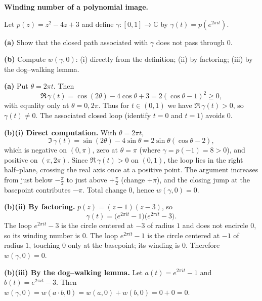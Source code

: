\begin{problem}[CP-II-0536]
\label{prob:cp-ii-0536}
\textbf{Winding number of a polynomial image.}

\hspace*{1.5em}Let $p(z)=z^{2}-4z+3$ and define $\gamma:[0,1]\to\mathbb C$ by $\gamma(t)=p(e^{2\pi i t})$.

\smallskip

\noindent\textbf{(a)} Show that the closed path associated with $\gamma$ does not pass through $0$.

\noindent\textbf{(b)} Compute $w(\gamma,0)$:
(i) directly from the definition; (ii) by factoring; (iii) by the dog--walking lemma.

\bigskip
\end{problem}

\begin{solution}
\noindent\textbf{(a)} Put $\theta=2\pi t$. Then
\[
\Re\,\gamma(t)=\cos(2\theta)-4\cos\theta+3
=2(\cos\theta-1)^2\ge 0,
\]
with equality only at $\theta=0,2\pi$. Thus for $t\in(0,1)$ we have $\Re\,\gamma(t)>0$, so
$\gamma(t)\ne 0$. The associated closed loop (identify $t=0$ and $t=1$) avoids $0$.

\smallskip

\noindent\textbf{(b)(i) Direct computation.}
With $\theta=2\pi t$,
\[
\Im\,\gamma(t)=\sin(2\theta)-4\sin\theta
=2\sin\theta(\cos\theta-2),
\]
which is negative on $(0,\pi)$, zero at $\theta=\pi$ (where $\gamma=\!p(-1)=8>0$), and positive on
$(\pi,2\pi)$. Since $\Re\,\gamma(t)>0$ on $(0,1)$, the loop lies in the right half--plane,
crossing the real axis once at a positive point. The argument increases from just below
$-\frac{\pi}{2}$ to just above $+\frac{\pi}{2}$ (change $+\pi$), and the closing jump at the basepoint
contributes $-\pi$. Total change $0$, hence $w(\gamma,0)=0$.

\smallskip

\noindent\textbf{(b)(ii) By factoring.}
$p(z)=(z-1)(z-3)$, so
\[
\gamma(t)=\big(e^{2\pi i t}-1\big)\big(e^{2\pi i t}-3\big).
\]
The loop $e^{2\pi i t}-3$ is the circle centered at $-3$ of radius $1$ and does not encircle $0$,
so its winding number is $0$. The loop $e^{2\pi i t}-1$ is the circle centered at $-1$ of radius $1$,
touching $0$ only at the basepoint; its winding is $0$. Therefore $w(\gamma,0)=0$.

\smallskip

\noindent\textbf{(b)(iii) By the dog--walking lemma.}
Let $a(t)=e^{2\pi i t}-1$ and $b(t)=e^{2\pi i t}-3$. Then
$w(\gamma,0)=w(a\cdot b,0)=w(a,0)+w(b,0)=0+0=0$.
\end{solution}

